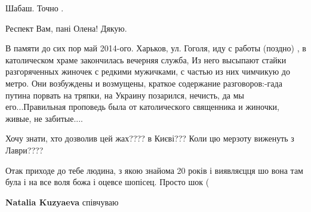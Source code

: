 \begin{itemize}
Шабаш. Точно .

 
Респект Вам, пані Олена! Дякую.🌺🌺🌺

 

В памяти до сих пор май 2014-ого. Харьков, ул. Гоголя, иду с работы (поздно) ,
в католическом храме закончилась вечерняя служба, Из него высыпают стайки
разгоряченных жиночек с редкими мужичками, с частью из них чимчикую до метро.
Они возбуждены и возмущены, краткое содержание разговоров:-гада путина порвать
на тряпки, на Украину позарился, нечисть, да мы его...Правильная проповедь была
от католического священника и жиночки, живые, не забитые....

 
Хочу знати, хто дозволив цей жах???? в Києві??? Коли цю мерзоту виженуть з Лаври????

 

Отак приходе до тебе людина, з якою знайома 20 років і виявляєцця шо вона там
була і на все воля божа і оцевсе шопісец. Просто шок (

\begin{itemize}
 
\textbf{Natalia Kuzyaeva} співчуваю
\end{itemize}


\end{itemize}
